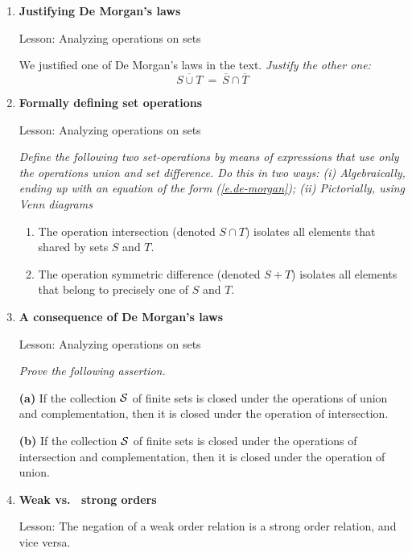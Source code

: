 {\begin{enumerate}
\item
{\bf Justifying De Morgan's laws}

{\sc Lesson:} Analyzing operations on sets

\smallskip 

We justified one of De Morgan's laws in the text.  {\em Justify the other one:}
\[ \overline{S \cup T} \ = \ \overline{S} \cap \overline{T} \]

\item
{\bf Formally defining set operations}

{\sc Lesson:} Analyzing operations on sets

\smallskip 

{\em Define the following two set-operations by means of expressions that use only the operations {\sc union} and {\sc set difference}.  Do this in two ways: (i) Algebraically, ending up with an equation of the form (\ref{e.de-morgan}); (ii) Pictorially, using Venn diagrams }
  \begin{enumerate}
  \item
The operation {\sc intersection} (denoted $S \cap T$) isolates all elements that shared by sets $S$ and $T$.
  \item
The operation {\sc symmetric difference} (denoted $S+T$) isolates all elements that belong to precisely one of $S$ and $T$.
  \end{enumerate}
  
\item
{\bf A consequence of De Morgan's laws}

{\sc Lesson:} Analyzing operations on sets

\smallskip

{\em Prove the following assertion.}

\begin{prop}
{\bf (a)}
If the collection $\cal S$ of finite sets is closed under the operations of union and complementation, then it is closed under the operation of intersection.

{\bf (b)}
If the collection $\cal S$ of finite sets is closed under the operations of intersection and complementation, then it is closed under the operation of union.
\end{prop}

\item
{\bf Weak vs.~ strong orders}

{\sc Lesson:} The negation of a weak order relation is a strong order relation, and vice versa.

\smallskip


\end{enumerate}}
